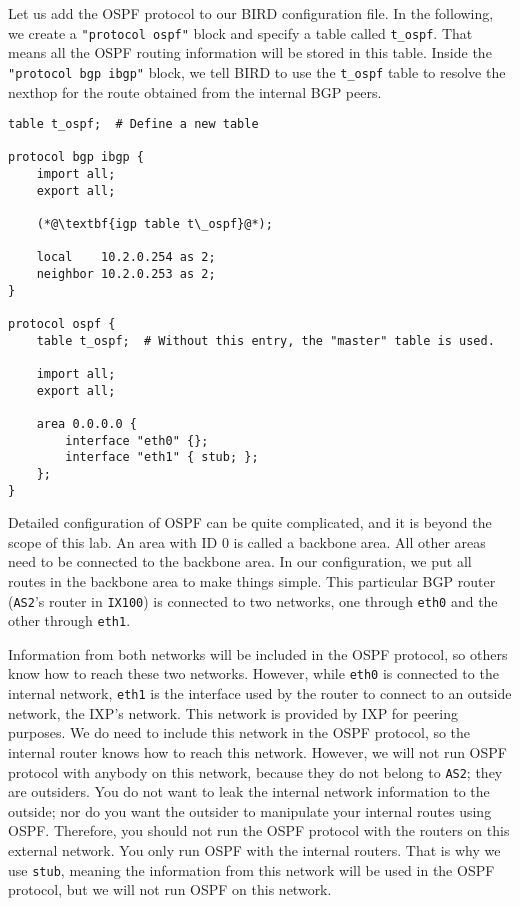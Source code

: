 Let us add the OSPF protocol to our BIRD configuration file. In the following,
we create a \texttt{"protocol ospf"} block and specify a table called \texttt{t\_ospf}.
That means all the OSPF routing information will be stored in
this table. Inside the \texttt{"protocol bgp ibgp"} block, we tell BIRD to 
use the \texttt{t\_ospf} table to resolve the nexthop for 
the route obtained from the internal BGP peers. 


\begin{lstlisting}
table t_ospf;  # Define a new table 

protocol bgp ibgp {
    import all;
    export all;

    (*@\textbf{igp table t\_ospf}@*);

    local    10.2.0.254 as 2;
    neighbor 10.2.0.253 as 2;
}

protocol ospf {
    table t_ospf;  # Without this entry, the "master" table is used.

    import all;
    export all;

    area 0.0.0.0 {
        interface "eth0" {};
        interface "eth1" { stub; };
    };
}
\end{lstlisting}


Detailed configuration of OSPF can be quite complicated, and it is beyond the 
scope of this lab. 
An area with ID 0 is called a backbone area. All other areas need
to be connected to the backbone area. In our configuration, we put all routes 
in the backbone area to make things simple. This 
particular BGP router (\texttt{AS2}'s router in \texttt{IX100})
is connected to two networks, one through \texttt{eth0} and the other 
through \texttt{eth1}.  

Information from both networks will be included in the OSPF protocol,
so others know how to reach these two networks. However, 
while \texttt{eth0} is connected to the internal network,
\texttt{eth1} is the interface used by the router
to connect to an outside network, the IXP's network. This network is provided
by IXP for peering purposes. We do need to include this network in the OSPF
protocol, so the internal router knows how to reach this network. However, we
will not run OSPF protocol with anybody on this network, because they 
do not belong to \texttt{AS2}; they are outsiders. 
You do not want to leak the internal network information to the outside; 
nor do you want the outsider to manipulate your internal routes using OSPF. 
Therefore, you should not run the OSPF protocol with
the routers on this external network. 
You only run OSPF with the internal routers.
That is why we use \texttt{stub}, meaning the information from this network
will be used in the OSPF protocol, but we will not run OSPF on
this network.   


